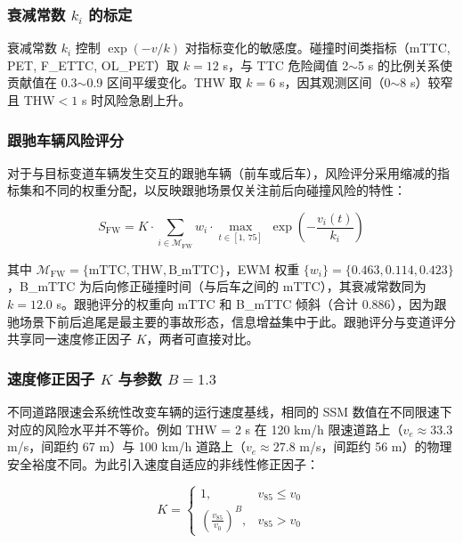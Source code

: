 \documentclass[preprint,review,12pt,a4paper]{elsarticle}
\begin{document}
\subsubsection{衰减常数 $k_i$ 的标定}

衰减常数 $k_i$ 控制 $\exp(-v/k)$ 对指标变化的敏感度。碰撞时间类指标（mTTC, PET, F\_ETTC, OL\_PET）取 $k=12$ s，与 TTC 危险阈值 2$\sim$5 s\cite{C06} 的比例关系使贡献值在 0.3$\sim$0.9 区间平缓变化。THW 取 $k=6$ s，因其观测区间（0$\sim$8 s）较窄且 THW$<1$ s 时风险急剧上升\cite{C18}。

\subsubsection{跟驰车辆风险评分}

对于与目标变道车辆发生交互的跟驰车辆（前车或后车），风险评分采用缩减的指标集和不同的权重分配，以反映跟驰场景仅关注前后向碰撞风险的特性：

\begin{equation}
S_{\text{FW}} = K \cdot \sum_{i \in \mathcal{M}_{\text{FW}}} w_i \cdot \max_{t \in [1,\,75]}\;\exp\!\left(-\frac{v_i(t)}{k_i}\right)
\end{equation}

其中 $\mathcal{M}_{\text{FW}} = \{\text{mTTC}, \text{THW}, \text{B\_mTTC}\}$，EWM 权重 $\{w_i\} = \{0.463, 0.114, 0.423\}$，B\_mTTC 为后向修正碰撞时间（与后车之间的 mTTC），其衰减常数同为 $k = 12.0$ s。跟驰评分的权重向 mTTC 和 B\_mTTC 倾斜（合计 0.886），因为跟驰场景下前后追尾是最主要的事故形态，信息增益集中于此。跟驰评分与变道评分共享同一速度修正因子 $K$，两者可直接对比。

\subsubsection{速度修正因子 $K$ 与参数 $B=1.3$}

不同道路限速会系统性改变车辆的运行速度基线，相同的 SSM 数值在不同限速下对应的风险水平并不等价。例如 THW = 2 s 在 120 km/h 限速道路上（$v_e \approx 33.3$ m/s，间距约 67 m）与 100 km/h 道路上（$v_e \approx 27.8$ m/s，间距约 56 m）的物理安全裕度不同。为此引入速度自适应的非线性修正因子：

\begin{equation}
K = \begin{cases}
1, & v_{85} \leq v_0 \\[4pt]
\displaystyle\left(\frac{v_{85}}{v_0}\right)^{B}, & v_{85} > v_0
\end{cases}
\end{equation}
\end{document}
